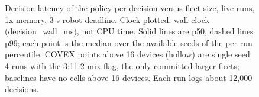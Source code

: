 \documentclass[sigconf]{acmart}
\begin{document}
{\selectfont
\begin{figure}[t]
  \centering
  
  \caption{Decision latency of the policy per decision versus fleet size, live runs, 1x memory, 3 s robot deadline. Clock plotted: wall clock (decision\_wall\_ms), not CPU time. Solid lines are p50, dashed lines p99; each point is the median over the available seeds of the per-run percentile. COVEX points above 16 devices (hollow) are single seed 4 runs with the 3:11:2 mix flag, the only committed larger fleets; baselines have no cells above 16 devices. Each run logs about 12,000 decisions.}
  \label{fig:F14_decision_latency}
\end{figure}
}


\end{document}
